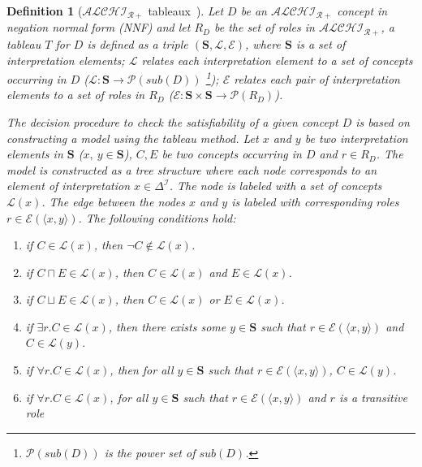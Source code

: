 \documentclass{article}
\newtheorem{mydef}{Definition}
\begin{document}
\begin{mydef}[$\mathcal{ALCHI_{R+}}$ tableaux~\cite{horrocks1999description}]
Let $D$ be an $\mathcal{ALCHI_{R+}}$ concept in negation normal form (NNF) and let $R_D$ be the set of roles in $\mathcal{ALCHI_{R+}}$, a tableau $T$ for $D$ is defined as a triple 
$(\mathbf{S},\mathcal{L}, \mathcal{E})$, where $\mathbf{S}$ is a set of interpretation elements; 
$\mathcal{L}$ relates each interpretation element to a set of concepts occurring in $D$ ($\mathcal{L}:\mathbf{S}\rightarrow\mathcal{P}(sub(D))$
\footnote{$\mathcal{P}(sub(D))$ is the power set of $sub(D)$.}); 
$\mathcal{E}$ relates each pair of interpretation elements to a set of roles in $R_D$  ($\mathcal{E}:\mathbf{S}\times\mathbf{S}\rightarrow \mathcal{P}(R_D)$). 

The decision procedure to check the satisfiability of a given concept $D$ is based on constructing a model using the tableau method. 
Let $x$ and $y$ be two interpretation elements in $\mathbf{S}$ ($x,~y\in \mathbf{S}$), $C,E$ be two concepts occurring in $D$ and $r\in R_D$.
The model is constructed as a tree structure where each node corresponds to an element of interpretation $x\in \Delta^\mathcal{I}$.
The node is labeled with a set of concepts $\mathcal{L}(x)$.
The edge between the nodes $x$ and $y$ is labeled with corresponding roles $r\in\mathcal{E}(\langle x,y \rangle)$.
The following conditions hold:
\begin{enumerate}
\item if $C\in \mathcal{L}(x)$, then $\neg C\notin\mathcal{L}(x)$.
\item if $C\sqcap E\in \mathcal{L}(x)$, then $ C\in\mathcal{L}(x)$ and $ E\in\mathcal{L}(x)$.
\item if $C\sqcup E\in \mathcal{L}(x)$, then $ C\in\mathcal{L}(x)$ or $ E\in\mathcal{L}(x)$.
\item if $\exists r.C\in \mathcal{L}(x)$, then there exists some $y\in \mathbf{S}$  such that $r \in \mathcal{E}(\langle x,y\rangle)$ and $C\in\mathcal{L}(y)$.
\item if $\forall r.C\in \mathcal{L}(x)$, then for all  $y \in \mathbf{S}$ such that $r \in \mathcal{E}(\langle x,y\rangle)$, $C\in\mathcal{L}(y)$.
\item if $\forall r.C\in \mathcal{L}(x)$, for all $y \in \mathbf{S}$ such that $r \in \mathcal{E}(\langle x,y\rangle)$ and $r$ is a transitive role

\end{enumerate}
\end{mydef}
\end{document}
